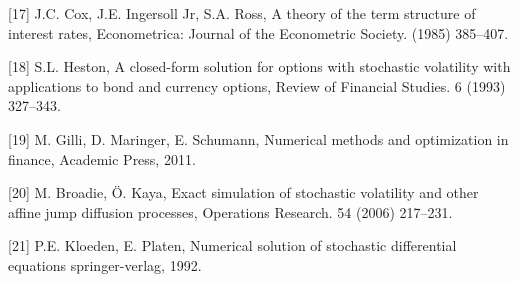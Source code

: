 \documentclass[12pt,twoside]{reedthesis}
\theoremstyle{definition}
\theoremstyle{definition}
\theoremstyle{remark}
\begin{document}
  \hypertarget{ref-cox1985theory}{}
  {[}17{]} J.C. Cox, J.E. Ingersoll Jr, S.A. Ross, A theory of the term
  structure of interest rates, Econometrica: Journal of the Econometric
  Society. (1985) 385--407.
  
  \hypertarget{ref-heston1993closed}{}
  {[}18{]} S.L. Heston, A closed-form solution for options with stochastic
  volatility with applications to bond and currency options, Review of
  Financial Studies. 6 (1993) 327--343.
  
  \hypertarget{ref-gilli_numerical_2011}{}
  {[}19{]} M. Gilli, D. Maringer, E. Schumann, Numerical methods and
  optimization in finance, Academic Press, 2011.
  
  \hypertarget{ref-broadie2006exact}{}
  {[}20{]} M. Broadie, Ö. Kaya, Exact simulation of stochastic volatility
  and other affine jump diffusion processes, Operations Research. 54
  (2006) 217--231.
  
  \hypertarget{ref-kloeden1992}{}
  {[}21{]} P.E. Kloeden, E. Platen, Numerical solution of stochastic
  differential equations springer-verlag, 1992.


\end{document}
